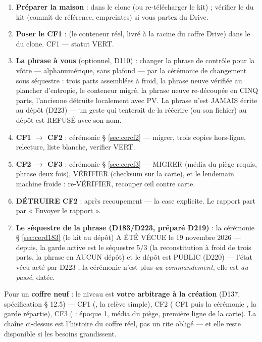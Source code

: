 \begin{enumerate}
\item \textbf{Préparer la maison} :  dans le clone (ou re-télécharger
le kit) ; vérifier le  du kit (commit de référence, empreintes)
si vous partez du Drive.
\item \textbf{Poser le CF1} :  (le conteneur réel, livré à la
racine du coffre Drive) dans le  du clone. CF1 — statut
VERT.
\item \textbf{La phrase à vous} (optionnel, D110) : changer la phrase de contrôle
pour la vôtre — alphanumérique, sans plafond — par la cérémonie de
changement sous séquestre : trois parts assemblées à froid, la phrase neuve
vérifiée au plancher d'entropie, le conteneur migré, la phrase neuve
re-découpée en CINQ parts, l'ancienne détruite localement avec PV. La
phrase n'est JAMAIS écrite au dépôt (D223) — un geste qui tenterait de la
réécrire (ou son fichier) au dépôt est REFUSÉ avec son nom.
\item \textbf{CF1 $\to$ CF2} : cérémonie § \ref{sec:cercf2} — migrer, trois copies
hors-ligne, relecture, liste blanche, verifier VERT.
\item \textbf{CF2 $\to$ CF3} : cérémonie § \ref{sec:cercf3} — MIGRER (média du piège
requis, phrase deux fois), VÉRIFIER (checksum sur la carte), et le lendemain machine
froide : re-VÉRIFIER, recouper œil contre carte.
\item \textbf{DÉTRUIRE CF2} : après recoupement — la case explicite. Le rapport
part par « Envoyer le rapport ».
\item \textbf{Le séquestre de la phrase (D183/D223, préparé D219)} : la
cérémonie § \ref{sec:cerd183} (le kit au dépôt) A ÉTÉ VÉCUE le
19 novembre 2026 — depuis, la garde active est le séquestre 5/3
(la reconstitution à froid de trois parts, la phrase en AUCUN
dépôt) et le dépôt est PUBLIC (D220) — l'état vécu acté par D223 ;
la cérémonie n'est plus \emph{au commandement}, elle est \emph{au
passé}, datée.
\end{enumerate}

Pour un \textbf{coffre neuf} : le niveau est \textbf{votre arbitrage à la création}
(D137, spécification § 12.5) — CF1 (, la relève simple),
CF2 ( CF1 puis la cérémonie , la garde
répartie), CF3 ( : époque 1, média du piège, première
ligne de la carte). La chaîne ci-dessus est l'histoire du coffre réel, pas un rite
obligé — et elle reste disponible si les besoins grandissent.


